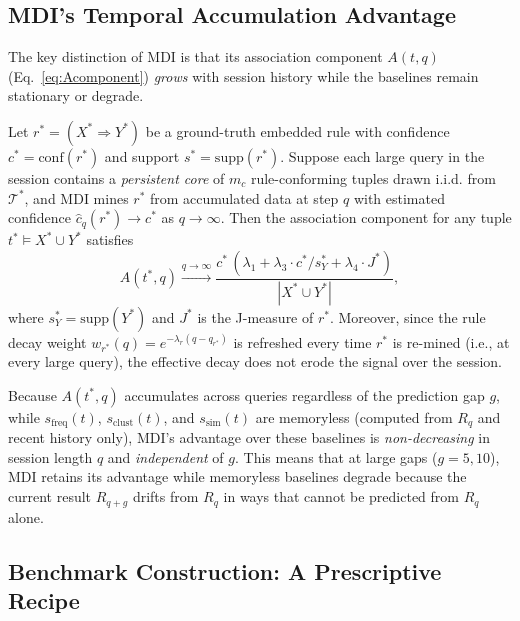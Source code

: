 \subsection{MDI's Temporal Accumulation Advantage}
\label{sec:theory:mdi}

The key distinction of MDI is that its association component $A(t,q)$
(Eq.~\ref{eq:Acomponent}) \emph{grows} with session history while the baselines
remain stationary or degrade.

\begin{proposition}
\label{prop:temporal}
Let $r^* = (X^* \Rightarrow Y^*)$ be a ground-truth embedded rule with
confidence $c^* = \text{conf}(r^*)$ and support $s^* = \text{supp}(r^*)$.
Suppose each large query in the session contains a \emph{persistent core} of
$m_c$ rule-conforming tuples drawn i.i.d. from $\mathcal{T}^*$, and MDI mines
$r^*$ from accumulated data at step $q$ with estimated confidence
$\hat{c}_q(r^*) \to c^*$ as $q \to \infty$.  Then the association component
for any tuple $t^* \models X^* \cup Y^*$ satisfies
\[
  A(t^*, q) \xrightarrow{q \to \infty}
  \frac{c^*\,(\lambda_1 + \lambda_3 \cdot c^*/s_Y^* + \lambda_4 \cdot J^*)}{|X^* \cup Y^*|},
\]
where $s_Y^* = \text{supp}(Y^*)$ and $J^*$ is the J-measure of $r^*$.
Moreover, since the rule decay weight $w_{r^*}(q) = e^{-\lambda_r(q - q_{r^*})}$
is refreshed every time $r^*$ is re-mined (i.e., at every large query), the
effective decay does not erode the signal over the session.
\end{proposition}

\begin{corollary}
\label{cor:gap}
Because $A(t^*, q)$ accumulates across queries regardless of the prediction gap
$g$, while $s_{\mathrm{freq}}(t)$, $s_{\mathrm{clust}}(t)$, and
$s_{\mathrm{sim}}(t)$ are memoryless (computed from $R_q$ and recent history
only), MDI's advantage over these baselines is \emph{non-decreasing} in session
length $q$ and \emph{independent} of $g$.  This means that at large gaps
($g = 5, 10$), MDI retains its advantage while memoryless baselines degrade
because the current result $R_{q+g}$ drifts from $R_q$ in ways that cannot be
predicted from $R_q$ alone.
\end{corollary}

\subsection{Benchmark Construction: A Prescriptive Recipe}
\label{sec:theory:recipe}

